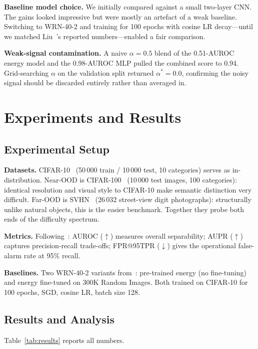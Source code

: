 \documentclass[10pt,twocolumn,letterpaper]{article}
\begin{document}
\textbf{Baseline model choice.}
We initially compared against a small two-layer CNN.
The gains looked impressive but were mostly an artefact of
a weak baseline.
Switching to WRN-40-2 and training for 100 epochs with
cosine LR decay---until we matched Liu~\etal's reported
numbers---enabled a fair comparison.

\textbf{Weak-signal contamination.}
A naive $\alpha\!=\!0.5$ blend of the 0.51-AUROC energy
model and the 0.98-AUROC MLP pulled the combined score to
0.94.
Grid-searching $\alpha$ on the validation split returned
$\alpha^*\!=\!0.0$, confirming the noisy signal should be
discarded entirely rather than averaged in.

\section{Experiments and Results}

\subsection{Experimental Setup}

\textbf{Datasets.}
CIFAR-10~\cite{krizhevsky2009} (50\,000 train / 10\,000
test, 10 categories) serves as in-distribution.
Near-OOD is CIFAR-100~\cite{krizhevsky2009} (10\,000 test
images, 100 categories): identical resolution and visual
style to CIFAR-10 make semantic distinction very difficult.
Far-OOD is SVHN~\cite{netzer2011} (26\,032 street-view
digit photographs): structurally unlike natural objects,
this is the easier benchmark.
Together they probe both ends of the difficulty spectrum.

\textbf{Metrics.}
Following~\cite{liu2020,hendrycks2017}: AUROC ($\uparrow$)
measures overall separability; AUPR ($\uparrow$) captures
precision-recall trade-offs; FPR@95TPR ($\downarrow$)
gives the operational false-alarm rate at 95\% recall.

\textbf{Baselines.}
Two WRN-40-2 variants from~\cite{liu2020}: pre-trained
energy (no fine-tuning) and energy fine-tuned on 300K
Random Images.
Both trained on CIFAR-10 for 100 epochs, SGD, cosine LR,
batch size 128.

\subsection{Results and Analysis}

Table~\ref{tab:results} reports all numbers.
\end{document}
